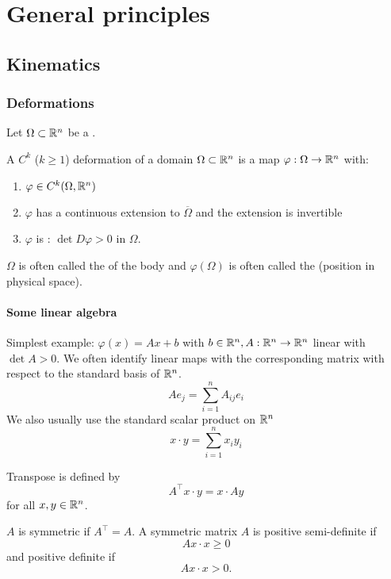 \chapter{General principles}

\section{Kinematics}

\subsection{Deformations}

Let \(\Omega\subset\mathbb{R}^n\) be a  .

\begin{definition}\label{def:1.1}
    A \(C^k\) (\(k\geq 1\)) deformation of a domain \(\Omega\subset\mathbb{R}^n\) is a map \(\varphi:\Omega\to\mathbb{R}^n\) with:
    \begin{enumerate}
        \item \(\varphi\in C^k(\Omega,\mathbb{R}^n)\) 
        \item \(\varphi\) has a continuous extension to \(\overline{\Omega}\) and the extension is invertible
        \item \(\varphi\) is : \(\det D\varphi>0\) in \(\Omega\).
    \end{enumerate}
    \(\Omega\) is often called the  of the body and \(\varphi(\Omega)\) is often called 
    the  (position in physical space).
\end{definition}

\subsubsection*{Some linear algebra}%

Simplest example: \(\varphi(x)=Ax+b\) with \(b\in \mathbb{R}^n, A:\mathbb{R}^n\to\mathbb{R}^n\) linear with \(\det A>0\).
We often identify linear maps with the corresponding matrix with respect to the standard basis of \(\mathbb{R}^n\).
\[Ae_j=\sum_{i=1}^nA_{ij}e_i\]
We also usually use the standard scalar product on \(\mathbb{R}^n\)
\[x\cdot y=\sum_{i=1}^n x_iy_i\]

Transpose is defined by 
\[A^\intercal x\cdot y=x\cdot A y\]
for all \(x,y\in\mathbb{R}^n\).

\(A\) is symmetric if \(A^\intercal =A\). A symmetric matrix \(A\) is positive semi-definite if 
\[Ax\cdot x\geq 0\]
and positive definite if 
\[Ax\cdot x> 0.\]

